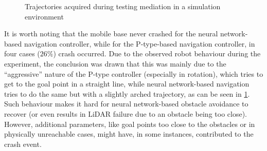 \begin{figure}
    \centering
    \hfill
    \caption{Trajectories acquired during testing mediation in a simulation environment}
    \label{fig:SimulationTest}
\end{figure}

It is worth noting that the mobile base never crashed for the neural network-based navigation controller, while for the P-type-based navigation controller, in four cases ($26\%$) crash occurred. Due to the observed robot behaviour during the experiment, the conclusion was drawn that this was mainly due to the ``aggressive'' nature of the P-type controller (especially in rotation), which tries to get to the goal point in a straight line, while neural network-based navigation tries to do the same but with a slightly arched trajectory, as can be seen in \cref{fig:SimulationTest}. Such behaviour makes it hard for neural network-based obstacle avoidance to recover (or even results in LiDAR failure due to an obstacle being too close). However, additional parameters, like goal points too close to the obstacles or in physically unreachable cases, might have, in some instances, contributed to the crash event. 


